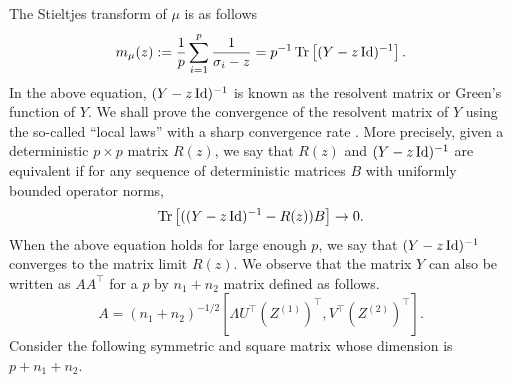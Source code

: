 The Stieltjes transform of $\mu$ is as follows
 \[ m_{\mu}(z) := \frac{1}{p}\sum_{i=1}^p \frac{1}{\sigma_i - z}= p^{-1}\operatorname{Tr}\left[(Y-z\operatorname{Id})^{-1}\right]. \]
In the above equation, $(Y - z\operatorname{Id})^{-1}$ is known as the resolvent matrix or Green's function of $Y$.
We shall prove the convergence of the resolvent matrix of $Y$ using the so-called ``local laws'' with a sharp convergence rate \cite{isotropic,erdos2017dynamical,Anisotropic}.
More precisely, given a deterministic $p\times p$ matrix $R(z)$, we say that $R(z)$ and $(Y-z\operatorname{Id})^{-1}$ are equivalent if for any sequence of deterministic matrices $B$ with uniformly bounded operator norms,
$$\operatorname{Tr}\left[((Y-z\operatorname{Id})^{-1}-R(z))B\right]\to 0.$$
When the above equation holds for large enough $p$, we say that $(Y-z\operatorname{Id})^{-1}$ converges to the matrix limit $R(z)$.
We observe that the matrix $Y$ can also be written as $A A^{\top}$ for a $p$ by $n_1 + n_2$ matrix defined as follows.
	\[ A = (n_1+ n_2)^{-1/2} [\Lambda U^\top (Z^{(1)})^\top,V^\top (Z^{(2)})^\top]. \]
Consider the following symmetric and square matrix whose dimension is $p + n_1 + n_2$.
